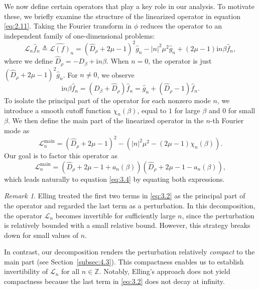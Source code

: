 \documentclass[11pt]{article}
\theoremstyle{definition}
\theoremstyle{remark}
\newtheorem*{remark}{Remark}
\numberwithin{equation}{section}
\newcommand{\mbb}{\mathbb}
\newcommand{\mcal}{\mathcal}
\renewcommand{\hat}{\widehat}
\newcommand{\Z}{\mbb{Z}}
\begin{document}
We now define certain operators that play a key role in our analysis. To motivate these, we briefly examine the structure of the linearized operator in equation \eqref{eq:2.11}. Taking the Fourier transform in $\phi$ reduces the operator to an independent family of one-dimensional problems:
\begin{equation} \label{eq:3.2}
\mcal{L}_n \hat{f}_n \triangleq \widehat{\mcal{L}(f)}_n = (\hat{D}_\rho + 2\mu - 1)^2 \hat{g}_n - |n|^2 \mu^2 \hat{g}_n + (2\mu - 1) \textrm{i}n\beta \hat{f}_n,
\end{equation}
where we define $\hat{D}_\rho = -D_\beta + \textrm{i}n \beta$. When $n=0$, the operator is just $(\hat{D}_\rho + 2\mu - 1)^2 \hat{g}_n$. For $n\neq 0$, we observe
\[\textrm{i}n\beta \hat{f}_n = (D_\beta + \hat{D}_\rho) \hat{f}_n = \hat{g}_n + (\hat{D}_\rho - 1) \hat{f}_n.\]
To isolate the principal part of the operator for each nonzero mode $n$, we introduce a smooth cutoff function $\chi_n(\beta)$, equal to $1$ for large $\beta$ and $0$ for small $\beta$. We then define the main part of the linearized operator in the $n$-th Fourier mode as
\[\mcal{L}^{\text{main}}_n = (\hat{D}_\rho + 2\mu - 1)^2 - (|n|^2 \mu^2 - (2\mu - 1)\chi_n(\beta)).\]
Our goal is to factor this operator as
\[\mcal{L}^{\text{main}}_n = (\hat{D}_\rho + 2\mu - 1 + a_n(\beta)) (\hat{D}_\rho + 2\mu - 1 - a_n(\beta)),\]
which leads naturally to equation \eqref{eq:3.4} by equating both expressions.
\begin{remark}
Elling \cite{Ell13, Ell16} treated the first two terms in \eqref{eq:3.2} as the principal part of the operator and regarded the last term as a perturbation. In this decomposition, the operator $\mcal{L}_n$ becomes invertible for sufficiently large $n$, since the perturbation is relatively bounded with a small relative bound. However, this strategy breaks down for small values of $n$.

\noindent In contrast, our decomposition renders the perturbation relatively \emph{compact} to the main part (see Section~\ref{subsec:4.3}). This compactness enables us to establish invertibility of $\mcal{L}_n$ for all $n \in \Z$. Notably, Elling’s approach does not yield compactness because the last term in \eqref{eq:3.2} does not decay at infinity.
\end{remark}
\end{document}
